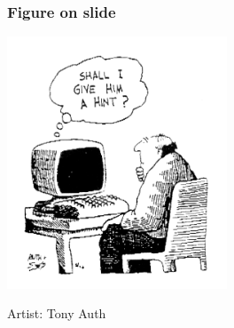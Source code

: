 \documentclass[english,hangout]{beamer}
\begin{document}
\begin{frame}
\frametitle{Figure on slide}
\begin{center}
\vspace{-1.2em}
\includegraphics[height=7.5cm]{shall_i_give_him_a_hint.png}
\end{center}
\vspace{-6mm}
\tiny Artist: Tony Auth
\end{frame}
\end{document}
